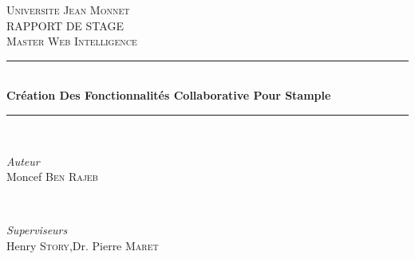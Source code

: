 \documentclass[12pt]{article}
\begin{document}
\begin{titlepage}

\newcommand{\HRule}{\rule{\linewidth}{0.9mm}} %

\center %
 


\textsc{\LARGE Universite Jean Monnet}\\[1.5cm] %
\textsc{\Large RAPPORT DE STAGE}\\[0.5cm] %
\textsc{\large Master Web Intelligence}\\[0.5cm] %


\HRule \\[1.2cm]
{ \huge \bfseries Cr\'eation Des Fonctionnalit\'es Collaborative Pour Stample}\\[1.3cm] %
\HRule \\[3cm]
 

\begin{minipage}{0.45\textwidth}
\begin{flushleft} \large
\emph{Auteur}\\
Moncef \textsc{Ben Rajeb} %
\end{flushleft}
\end{minipage}
~
\begin{minipage}{0.45\textwidth}
\begin{flushleft} \large
\emph{Superviseurs} \\
Henry \textsc{Story},\newline Dr. Pierre \textsc{Maret} %


\end{flushleft}
\end{minipage}
\end{titlepage}
\end{document}
